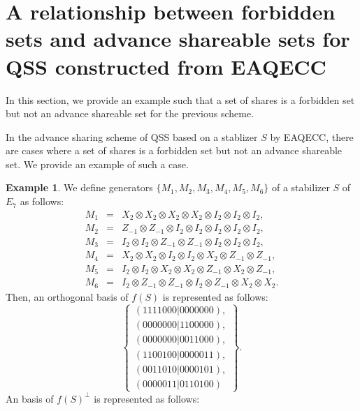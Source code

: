 \documentclass[11pt,a4paper]{article}
\theoremstyle{definition}
\newtheorem{example}{Example}
\begin{document}
\section{A relationship between forbidden sets and advance shareable sets for QSS constructed from EAQECC}\label{proof_of_forbidden}
In this section, we provide an example such that a set of shares is a forbidden set but not an advance shareable set for the previous scheme. 

In the advance sharing scheme of QSS based on a stablizer $S$ by EAQECC, there are cases where a set of shares is a forbidden set but not an advance shareable set.
We provide an example of such a case.

\begin{example}\label{ex_one}
    We define generators $\{M_1, M_2, M_3, M_4, M_5, M_6\}$ of a stabilizer $S$ of $E_7$ as follows:
    \begin{eqnarray}
        M_1 &=& X_2 \otimes X_2 \otimes X_2 \otimes X_2 \otimes I_2 \otimes I_2 \otimes I_2,\\
        M_2 &=& Z_{-1} \otimes Z_{-1} \otimes I_2 \otimes I_2 \otimes I_2 \otimes I_2 \otimes I_2,\\
        M_3 &=& I_2 \otimes I_2 \otimes Z_{-1} \otimes Z_{-1} \otimes I_2 \otimes I_2 \otimes I_2,\\
        M_4 &=& X_2 \otimes X_2 \otimes I_2 \otimes I_2 \otimes X_2 \otimes Z_{-1} \otimes Z_{-1},\\
        M_5 &=& I_2 \otimes I_2 \otimes X_2 \otimes X_2 \otimes Z_{-1} \otimes X_2 \otimes Z_{-1},\\
        M_6 &=& I_2 \otimes Z_{-1} \otimes Z_{-1} \otimes I_2 \otimes Z_{-1} \otimes X_2 \otimes X_2.
    \end{eqnarray}
    Then, an orthogonal basis of $f(S)$ is represented as follows:
    \begin{equation}
        \left\{
            \begin{array}{c}
                (1111000|0000000),\\
                (0000000|1100000),\\
                (0000000|0011000),\\
                (1100100|0000011),\\
                (0011010|0000101),\\
                (0000011|0110100)
            \end{array}
        \right\}.
    \end{equation}
    An basis of $f(S)^\perp$ is represented as follows:

\end{example}
\end{document}
